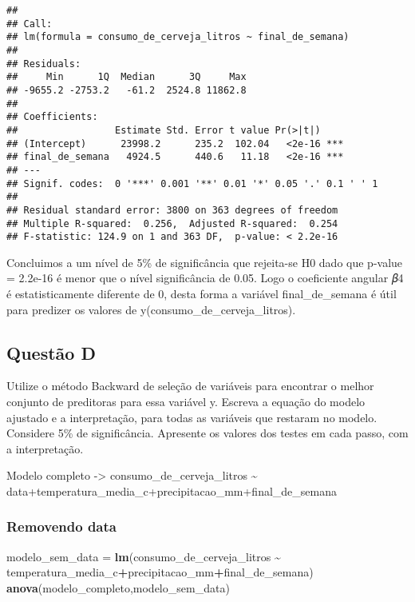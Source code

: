 \documentclass[
]{article}
\newenvironment{Shaded}{\begin{snugshade}}{\end{snugshade}}
\newcommand{\FunctionTok}[1]{\textcolor[rgb]{0.13,0.29,0.53}{\textbf{#1}}}
\newcommand{\NormalTok}[1]{#1}
\newcommand{\OtherTok}[1]{\textcolor[rgb]{0.56,0.35,0.01}{#1}}
\newcommand{\SpecialCharTok}[1]{\textcolor[rgb]{0.81,0.36,0.00}{\textbf{#1}}}
\begin{document}
\begin{verbatim}
## 
## Call:
## lm(formula = consumo_de_cerveja_litros ~ final_de_semana)
## 
## Residuals:
##     Min      1Q  Median      3Q     Max 
## -9655.2 -2753.2   -61.2  2524.8 11862.8 
## 
## Coefficients:
##                 Estimate Std. Error t value Pr(>|t|)    
## (Intercept)      23998.2      235.2  102.04   <2e-16 ***
## final_de_semana   4924.5      440.6   11.18   <2e-16 ***
## ---
## Signif. codes:  0 '***' 0.001 '**' 0.01 '*' 0.05 '.' 0.1 ' ' 1
## 
## Residual standard error: 3800 on 363 degrees of freedom
## Multiple R-squared:  0.256,  Adjusted R-squared:  0.254 
## F-statistic: 124.9 on 1 and 363 DF,  p-value: < 2.2e-16
\end{verbatim}

Concluimos a um nível de 5\% de significância que rejeita-se H0 dado que
p-value = 2.2e-16 é menor que o nível significância de 0.05. Logo o
coeficiente angular 𝛽4 é estatisticamente diferente de 0, desta forma a
variável final\_de\_semana é útil para predizer os valores de
y(consumo\_de\_cerveja\_litros).

\hypertarget{questuxe3o-d}{%
\subsection{Questão D}\label{questuxe3o-d}}

Utilize o método Backward de seleção de variáveis para encontrar o
melhor conjunto de preditoras para essa variável y. Escreva a equação do
modelo ajustado e a interpretação, para todas as variáveis que restaram
no modelo. Considere 5\% de significância. Apresente os valores dos
testes em cada passo, com a interpretação.

Modelo completo -\textgreater{} consumo\_de\_cerveja\_litros
\textasciitilde{}
data+temperatura\_media\_c+precipitacao\_mm+final\_de\_semana

\hypertarget{removendo-data}{%
\subsubsection{Removendo data}\label{removendo-data}}

\begin{Shaded}
\begin{Highlighting}[]
\NormalTok{modelo\_sem\_data }\OtherTok{=} \FunctionTok{lm}\NormalTok{(consumo\_de\_cerveja\_litros }\SpecialCharTok{\textasciitilde{}}\NormalTok{ temperatura\_media\_c}\SpecialCharTok{+}\NormalTok{precipitacao\_mm}\SpecialCharTok{+}\NormalTok{final\_de\_semana)}
\FunctionTok{anova}\NormalTok{(modelo\_completo,modelo\_sem\_data)}
\end{Highlighting}
\end{Shaded}
\end{document}

